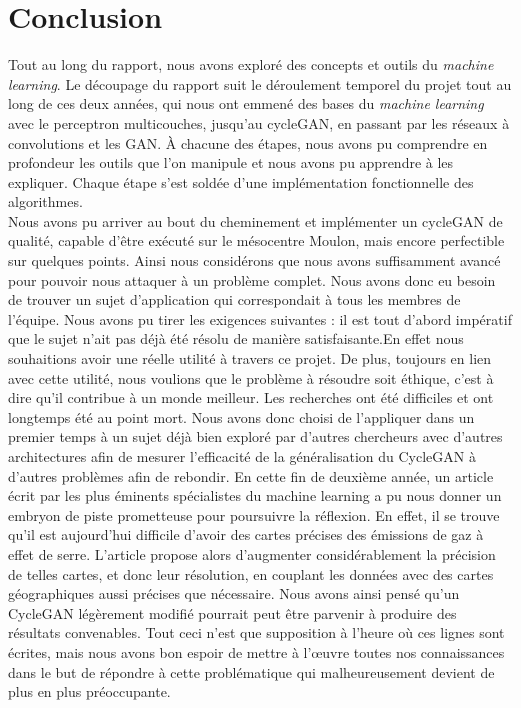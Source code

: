 \chapter*{Conclusion}


Tout au long du rapport, nous avons exploré des concepts et outils du \textit{machine learning}. Le découpage du rapport suit le déroulement temporel du projet tout au long de ces deux années, qui nous ont emmené des bases du \textit{machine learning} avec le perceptron multicouches, jusqu’au cycleGAN, en passant par les réseaux à convolutions et les GAN. À chacune des étapes, nous avons pu comprendre en profondeur les outils que l'on manipule et nous avons pu apprendre à les expliquer. Chaque étape s'est soldée d'une implémentation fonctionnelle des algorithmes.\\
Nous avons pu arriver au bout du cheminement et implémenter un cycleGAN de qualité, capable d'être exécuté sur le mésocentre Moulon, mais encore perfectible sur quelques points. Ainsi nous considérons que nous avons suffisamment avancé pour pouvoir nous attaquer à un problème complet. 
Nous avons donc eu besoin de trouver un sujet d'application qui correspondait à tous les membres de l'équipe. Nous avons pu tirer les exigences suivantes : il est tout d'abord impératif que le sujet n'ait pas déjà été résolu de manière satisfaisante.En effet nous souhaitions avoir une réelle utilité à travers ce projet. De plus, toujours en lien avec cette utilité, nous voulions que le problème à résoudre soit éthique, c'est à dire qu'il contribue à un monde meilleur. Les recherches ont été difficiles et ont longtemps été au point mort. Nous avons donc choisi de l'appliquer dans un premier temps à un sujet déjà bien exploré par d'autres chercheurs avec d'autres architectures afin de mesurer l'efficacité de la généralisation du CycleGAN à d'autres problèmes afin de rebondir.
En cette fin de deuxième année, un article écrit par les plus éminents spécialistes du machine learning \cite{rolnick_tackling_2019-1} a pu nous donner un embryon de piste prometteuse pour poursuivre la réflexion. En effet, il se trouve qu'il est aujourd'hui difficile d'avoir des cartes précises des émissions de gaz à effet de serre. L'article propose alors d'augmenter considérablement la précision de telles cartes, et donc leur résolution, en couplant les données avec des cartes géographiques aussi précises que nécessaire. Nous avons ainsi pensé qu'un CycleGAN légèrement modifié pourrait peut être parvenir à produire des résultats convenables. Tout ceci n'est que supposition à l'heure où ces lignes sont écrites, mais nous avons bon espoir de mettre à l’œuvre toutes nos connaissances dans le but de répondre à cette problématique qui malheureusement devient de plus en plus préoccupante.